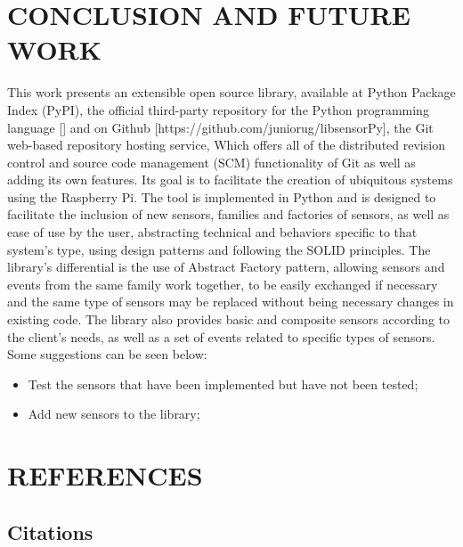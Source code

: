 \documentclass{acm_proc_article-sp}
\begin{document}
\section{CONCLUSION AND FUTURE WORK}
This work presents an extensible open source library, available at Python Package Index (PyPI), the official third-party repository for the Python programming language [] %
and on Github [https://github.com/juniorug/libsensorPy], the Git web-based repository hosting service, Which offers all of the distributed revision control and source code management (SCM) functionality of Git as well as adding its own features.
\newline
\newline
Its goal is to facilitate the creation of ubiquitous systems using the Raspberry Pi. The tool is implemented in Python and is designed to facilitate the inclusion of new sensors, families and factories of sensors, as well as ease of use by the user, abstracting technical and behaviors specific to that system's type, using design patterns and following the SOLID principles.
\newline
\newline
The library's differential is the use of Abstract Factory pattern, allowing sensors and events from the same family work together, to be easily exchanged if necessary and the same type of sensors may be replaced without being necessary changes in existing code. The library also provides basic and composite  sensors according to the client's needs, as well as a set of events related to specific types of sensors.
\newline
\newline
Some suggestions can be seen below:
\begin{itemize}
\item Test the sensors that have been implemented but have not been tested;
\item Add new sensors to the library;

\end{itemize}
\section{REFERENCES}

\subsection{Citations}
\end{document}
